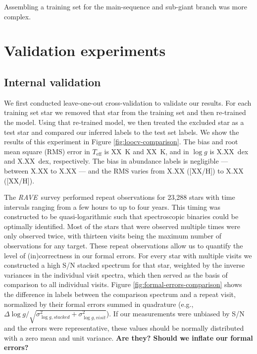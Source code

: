 \documentclass[preprint,trackchanges]{aastex}
\newcommand{\project}[1]{\textsl{#1}}
\newcommand{\acronym}[1]{{\small{#1}}}
\newcommand{\rave}{\project{\acronym{RAVE}}}
\newcommand{\logg}{\log g}
\newcommand{\teff}{T_{\mathrm{eff}}}
\newcommand{\stub}[1]{\textbf{#1}}
\begin{document}
Assembling a training set for the main-sequence and sub-giant branch was more complex.






\section{Validation experiments}
\label{sec:validation}


\subsection{Internal validation}
We first conducted leave-one-out cross-validation to validate our results.
For each training set star we removed that star from the training set and
then re-trained the model.  Using that re-trained model, we then treated
the excluded star as a test star and compared our inferred labels to the
test set labels.  We show the results of this experiment in Figure
\ref{fig:loocv-comparison}.  The bias and root mean square (RMS) error in 
$\teff$ is XX~K and XX~K, and in $\logg$ is X.XX~dex and X.XX~dex,
respectively.  The bias in abundance labels is negligible --- between
X.XX to X.XX --- and the RMS varies from X.XX ([XX/H]) to X.XX ([XX/H]).


The \rave\ survey performed repeat observations for 23,288 stars  with time 
intervals ranging from a few hours to up to four years.  This timing was 
constructed to be quasi-logarithmic such that spectroscopic binaries could
be optimally identified. Most of the stars that were observed multiple times
were only observed twice, with thirteen visits being the maximum number 
of observations for any target.  These repeat observations allow us to 
quantify the level of (in)correctness in our formal errors.  For every star
with multiple visits we constructed a high S/N stacked spectrum for that
star, weighted by the inverse variances in the individual visit spectra,
which then served as the basis of comparison to all individual visits.  
Figure \ref{fig:formal-errors-comparison} shows the difference in labels 
between the comparison spectrum and a repeat visit, normalized by their 
formal errors summed in quadrature (e.g., $\Delta\logg/\sqrt{\sigma_{\logg,stacked}^2 + \sigma_{\logg,visit}^2}$).
If our measurements were unbiased by S/N and the errors were representative, 
these values should be normally distributed with a zero mean and unit variance.
\stub{Are they? Should we inflate our formal errors?}
\end{document}
